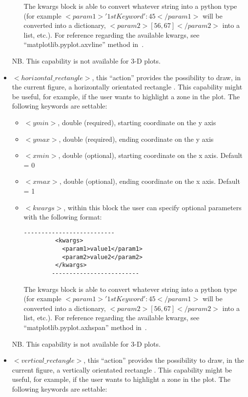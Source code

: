 \begin{itemize}
\begin{itemize}
         The kwargs block is able to convert whatever string into a python type (for example $<param1>{'1stKeyword':45}</param1>$ will be converted into a dictionary, $<param2>[56,67]</param2>$ into a list, etc.). For reference regarding the available kwargs, see ``matplotlib.pyplot.axvline'' method in~\cite{MatPlotLib}.
      \end{itemize}
 NB. This capability is not available  for 3-D plots.
\item $<horizontal\_rectangle>$, this ``action''  provides the possibility to draw, in the current figure, a horizontally orientated rectangle . This capability might be useful, for example, if the user wants to highlight a zone in the plot. The following keywords are settable:
    \begin{itemize}
        \item \textit{$<ymin>$}, double (required), starting coordinate on the y axis
        \item \textit{$<ymax>$}, double (required), ending coordinate on the y axis
        \item \textit{$<xmin>$}, double (optional), starting coordinate on the x axis. Default = 0
        \item \textit{$<xmax>$}, double (optional), ending coordinate on the x axis. Default = 1
        \item \textit{$<kwargs>$},  within this block the user can specify optional parameters with the following format:
        \begin{lstlisting}[style=XML]
        --------------------------
         <kwargs>
           <param1>value1</param1>
           <param2>value2</param2>
         </kwargs>
        -------------------------
       \end{lstlisting}
         The kwargs block is able to convert whatever string into a python type (for example $<param1>{'1stKeyword':45}</param1>$ will be converted into a dictionary, $<param2>[56,67]</param2>$ into a list, etc.). For reference regarding the available kwargs, see ``matplotlib.pyplot.axhspan'' method in~\cite{MatPlotLib}.
      \end{itemize}
 NB. This capability is not available  for 3-D plots.
\item $<vertical\_rectangle>$, this ``action''  provides the possibility to draw, in the current figure, a vertically orientated rectangle . This capability might be useful, for example, if the user wants to highlight a zone in the plot. The following keywords are settable:

\end{itemize}
